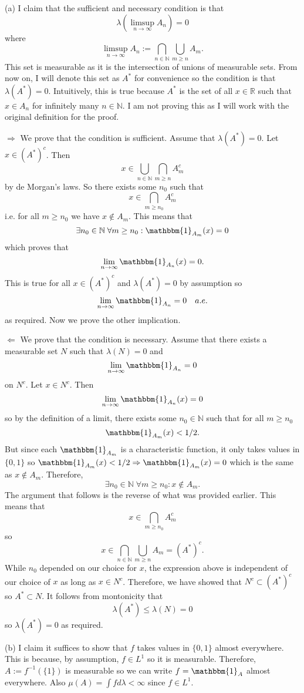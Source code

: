 \documentclass[12pt]{amsart} %
\def\N{\mathbb{N}}
\def\R{\mathbb{R}}
\def\1{\mathbbm{1}}
\begin{document}
\newpage
(a) I claim that the sufficient and necessary condition is that $$
\lambda\left( \limsup\limits_{n \to \infty} A_n \right) = 0$$ where $$
\limsup\limits_{n \to \infty}A_n := \bigcap_{n \in \N} \bigcup_{m \ge n} A_m.$$ This set is measurable as it is the intersection of unions of measurable sets. From now on, I will denote this set as $A^*$ for convenience so the condition is that $\lambda\left( A^* \right) = 0$. Intuitively, this is true because $A^*$ is the set of all  $x \in \R$ such that $x \in A_n$ for infinitely many $n \in \N$. I am not proving this as I will work with the original definition for the proof. 

$\Rightarrow$ We prove that the condition is sufficient. Assume that $\lambda\left( A^* \right) = 0$. Let $x \in (A^*)^c$. Then $$x \in \bigcup_{n \in \N} \bigcap_{m \ge  n} A_m^c$$ by de Morgan's laws. So there exists some $n_0$ such that  $$x \in \bigcap_{m \ge  n_0} A_m^c$$ i.e. for all $m \ge n_0$ we have $x \notin A_m$. This means that  $$\exists n_0 \in \N \; \forall m \ge n_0 : \1_{A_m}(x) = 0$$ which proves that $$\lim_{n \to \infty} \1_{A_n}(x) = 0.$$ This is true for all $x \in (A^*)^c$ and $\lambda(A^*) = 0$ by assumption so $$\lim_{n \to \infty} \1_{A_n} = 0\quad a.e.$$ as required. Now we prove the other implication. 

$\Leftarrow$ We prove that the condition is necessary. Assume that there exists a measurable set $N$ such that  $\lambda(N) = 0$ and $$\lim_{n \to \infty}  \1_{A_n} = 0$$ on $N^c$. Let  $x \in N^c$. Then $$\lim_{n \to \infty}  \1_{A_n}(x) = 0$$ so by the definition of a limit, there exists some $n_0 \in \N$ such that for all $m \ge  n_0$ $$
\1_{A_m}(x) < 1/2.$$ But since each $\1_{A_m}$ is a characteristic function, it only takes values in $\{0,1\}$ so $\1_{A_m}(x) < 1/2 \Rightarrow \1_{A_m}(x) = 0$ which is the same as $x \notin A_m$. Therefore, $$\exists n_0 \in \N \; \forall m \ge n_0 : x \notin A_m.$$ The argument that follows is the reverse of what was provided earlier. This means that $$x \in \bigcap_{m \ge  n_0} A_m^c$$ so $$x \in \bigcap_{n \in \N} \bigcup_{m \ge n} A_m = (A^*)^c.$$ While $n_0$ depended on our choice for  $x$, the expression above is independent of our choice of  $x$ as long as  $x \in N^c$. Therefore, we have showed that $N^c \subset (A^*)^c$ so $A^* \subset N$. It follows from montonicity that $$\lambda(A^*) \le  \lambda(N) = 0$$ so $\lambda(A^*)=0$ as required.  


\newpage \noindent
(b) I claim it suffices to show that  $f$ takes values in  $\{0,1\}$ almost everywhere. This is because, by assumption, $f \in L^1$ so it is measurable. Therefore, $A := f^{-1}(\{1\})$ is measurable so we can write $f = \1_A$ almost everywhere. Also $\mu(A) = \int f d\lambda < \infty$ since $f \in L^1$.  
\end{document}
